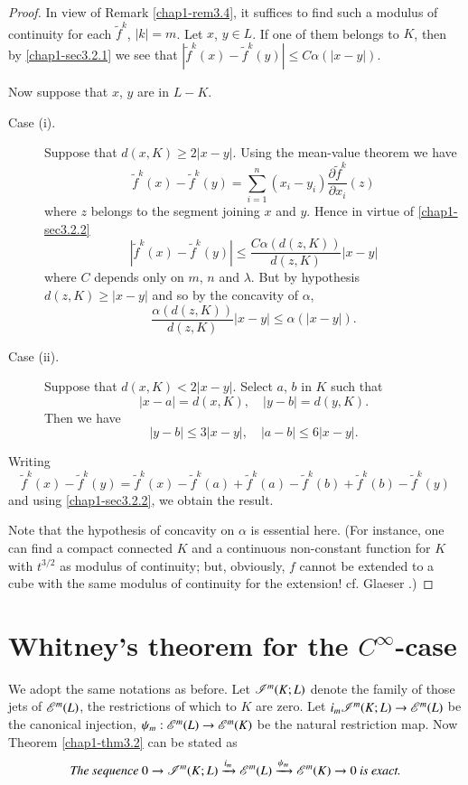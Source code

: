 \begin{proof}
In view of Remark \ref{chap1-rem3.4}, it suffices to find such a modulus of continuity for each $\widetilde{f}^{k}$, $|k|=m$. Let $x$, $y\in L$. If one of them belongs to $K$, then by \eqref{chap1-sec3.2.1} we see that $|\widetilde{f}^{k}(x)-\widetilde{f}^{k}(y)|\leq C\alpha (|x-y|)$.

Now suppose that $x$, $y$ are in $L-K$.
\begin{description}
\item[Case (i).] Suppose that $d(x,K)\geq 2|x-y|$. Using the mean-value theorem we have
$$
\widetilde{f}^{k}(x)-\widetilde{f}^{k}(y)=\sum\limits^{n}_{i=1}(x_{i}-y_{i})\dfrac{\partial \widetilde{f}^{k}}{\partial x_{i}}(z)
$$
where $z$ belongs to the segment joining $x$ and $y$. Hence in virtue of \eqref{chap1-sec3.2.2}
$$
|\widetilde{f}^{k}(x)-\widetilde{f}^{k}(y)|\leq \dfrac{C\alpha(d(z,K))}{d(z,K)}|x-y|
$$
where $C$ depends only on $m$, $n$ and $\lambda$. But by hypothesis $d(z,K)\geq |x-y|$ and so by the concavity of $\alpha$,
$$
\dfrac{\alpha(d(z,K))}{d(z,K)}|x-y|\leq \alpha(|x-y|).
$$

\item[Case (ii).] Suppose that $d(x,K)<2|x-y|$. Select $a$, $b$ in $K$ such that
$$
|x-a|=d(x,K),\quad |y-b|=d(y,K).
$$
Then we have
$$
|y-b|\leq 3|x-y|,\quad |a-b|\leq 6|x-y|.
$$\pageoriginale
\end{description}

Writing
$$
\widetilde{f}^{k}(x)-\widetilde{f}^{k}(y)=\widetilde{f}^{k}(x)-\widetilde{f}^{k}(a)+\widetilde{f}^{k}(a)-\widetilde{f}^{k}(b)+\widetilde{f}^{k}(b)-\widetilde{f}^{k}(y)
$$
and using \eqref{chap1-sec3.2.2}, we obtain the result.

Note that the hypothesis of concavity on $\alpha$ is essential here. (For instance, one can find a compact connected $K$ and a continuous non-constant function for $K$ with $t^{3/2}$ as modulus of continuity; but, obviously, $f$ cannot be extended to a cube with the same modulus of continuity for the extension! cf. Glaeser \cite{G. Glaeser: 1}.)
\end{proof}

\section{Whitney's theorem for the \boldmath$C^{\infty}$-case}\label{chap1-sec4}

We adopt the same notations as before. Let $\mathscr{I}^{m}(K;L)$ denote the family of those jets of $\mathscr{E}^{m}(L)$, the restrictions of which to $K$ are zero. Let $i_{m}\mathscr{I}^{m}(K;L)\to \mathscr{E}^{m}(L)$ be the canonical injection, $\psi_{m}:\mathscr{E}^{m}(L)\to \mathscr{E}^{m}(K)$ be the natural restriction map. Now Theorem \ref{chap1-thm3.2} can be stated as
$$
\text{\em The sequence } 0\to \mathscr{I}^{m}(K;L)\xrightarrow{i_{m}}\mathscr{E}^{m}(L)\xrightarrow{\psi_{m}}\mathscr{E}^{m}(K)\to 0\text{\em \ is exact.}
$$

